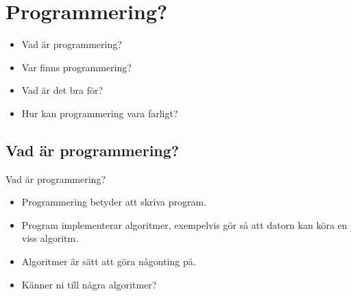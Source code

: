 \mode*

\begin{frame}
  \tableofcontents
\end{frame}

% 
% 

\section{Programmering?}


\begin{frame}
  \begin{question}
    \begin{itemize}
      \item Vad är programmering?
      \item Var finns programmering?
      \item Vad är det bra för?
      \item Hur kan programmering vara farligt?
    \end{itemize}
  \end{question}
\end{frame}

\subsection{Vad är programmering?}

\begin{frame}
  \begin{block}{Vad är programmering?}
    \begin{itemize}
      \item Programmering betyder att skriva program.
      \item Program implementerar algoritmer, exempelvis gör så att datorn kan 
        köra en viss algoritm.
      \item Algoritmer är sätt att göra någonting på.
    \end{itemize}
  \end{block}

  \pause

  \begin{exercise}
    \begin{itemize}
      \item Känner ni till några algoritmer?
    \end{itemize}
  \end{exercise}
\end{frame}

